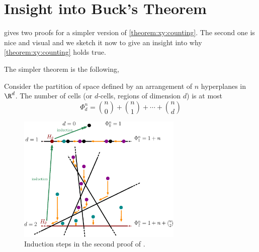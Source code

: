 \section{Insight into Buck's Theorem}

\citet*{matousek:2002} gives two proofs for a simpler version of
\ref{theorem:xy:counting}. The second one is nice and visual and we
sketch it now to give an insight into why \ref{theorem:xy:counting} holds
true.

The simpler theorem is the following,
\begin{theorem}
Consider the partition of space defined by an arrangement of \(n\) hyperplanes
in \(\R^d\). The number of cells (or \(d\)-cells, regions of dimension \(d\))
is at most
\begin{displaymath}
\Phi_d^n = \binom{n}{0} + \binom{n}{1} + \cdots + \binom{n}{d}
\end{displaymath}
\end{theorem}

\begin{figure}
\centering
\includegraphics[width=0.7\textwidth]{fig/x+y/buck/arrangement}
\caption{Induction steps in the second proof of \citet*{matousek:2002}.}
\label{fig:xy:buck:arrangement}
\end{figure}

